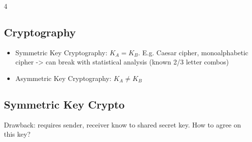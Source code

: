 \documentclass[10pt]{extarticle}
\begin{document}
\begin{multicols}{4}
\subsection{Cryptography}

\begin{itemize}
\item Symmetric Key Cryptography: $K_A = K_B$. E.g. Caesar cipher, monoalphabetic cipher -> can break with statistical analysis (known 2/3 letter combos)
\item Asymmetric Key Cryptography: $K_A \neq K_B$
\end{itemize}

\subsection{Symmetric Key Crypto}
Drawback: requires sender, receiver know to shared secret key. How to agree on this key?


\end{multicols}
\end{document}
